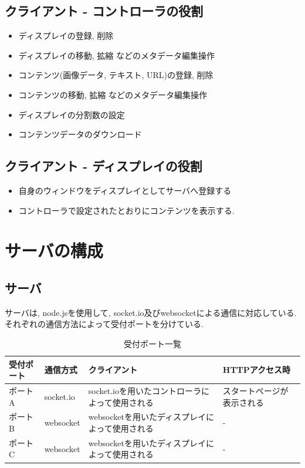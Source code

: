 \documentclass[a4paper,10pt,oneside]{jsbook}
\begin{document}
\subsection{クライアント - コントローラの役割}
\begin{itemize}
\item ディスプレイの登録, 削除
\item ディスプレイの移動, 拡縮 などのメタデータ編集操作
\item コンテンツ(画像データ, テキスト, URL)の登録, 削除
\item コンテンツの移動, 拡縮 などのメタデータ編集操作
\item ディスプレイの分割数の設定
\item コンテンツデータのダウンロード
\end{itemize}

\subsection{クライアント - ディスプレイの役割}
\begin{itemize}
\item 自身のウィンドウをディスプレイとしてサーバへ登録する
\item コントローラで設定されたとおりにコンテンツを表示する.
\end{itemize}

\section{サーバの構成}

\subsection{サーバ}
サーバは, node.jsを使用して, socket.io及びwebsocketによる通信に対応している. それぞれの通信方法によって受付ポートを分けている. 

\begin{table}[htbp]
\begin{center}
\caption{受付ポート一覧}
\label{ports}
\begin{tabular}{|l|l|l|l|}
\hline
受付ポート & 通信方式 & クライアント & HTTPアクセス時 \\
\hline
\hline
ポートA & socket.io & socket.ioを用いたコントローラによって使用される & スタートページが表示される \\
\hline
ポートB & websocket & websocketを用いたディスプレイによって使用される & - \\
\hline
ポートC & websocket & websocketを用いたディスプレイによって使用される & - \\
\hline

\end{tabular}
\end{center}
\end{table}
\end{document}
